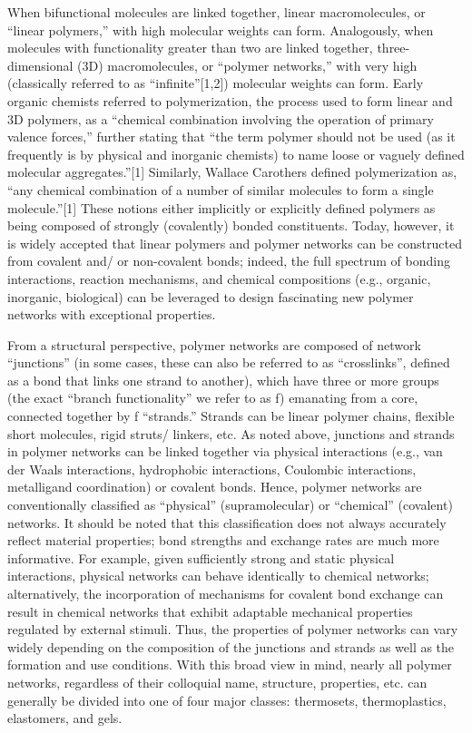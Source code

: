 \documentclass[../../main-notes.tex]{subfiles}
\begin{document}
When bifunctional molecules are linked together, linear macromolecules, or “linear polymers,” with high molecular weights can form. 
Analogously, when molecules with functionality greater than two are linked together, three-dimensional (3D) macromolecules, or “polymer networks,” with very high (classically referred to as “infinite”[1,2]) molecular weights can form. 
Early organic chemists referred to polymerization, the process used to form linear and 3D polymers, as a “chemical combination involving the operation of primary valence forces,” further stating that “the term polymer should not be used (as it frequently is by physical and inorganic chemists) to name loose or vaguely defined molecular aggregates.”[1] 
Similarly, Wallace Carothers defined polymerization as, “any chemical combination of a number of similar molecules to form a single molecule.”[1] 
These notions either implicitly or explicitly defined polymers as being composed of strongly (covalently) bonded constituents. 
Today, however, it is widely accepted that linear polymers and polymer networks can be constructed from covalent and/ or non-covalent bonds; indeed, the full spectrum of bonding interactions, reaction mechanisms, and chemical compositions (e.g., organic, inorganic, biological) can be leveraged to design fascinating new polymer networks with exceptional properties.

From a structural perspective, polymer networks are composed of network “junctions” (in some cases, these can also be referred to as “crosslinks”, defined as a bond that links one strand to another), which have three or more groups (the exact “branch functionality” we refer to as f) emanating from a core, connected together by f “strands.” 
Strands can be linear polymer chains, flexible short molecules, rigid struts/ linkers, etc. 
As noted above, junctions and strands in polymer networks can be linked together via physical interactions (e.g., van der Waals interactions, hydrophobic interactions, Coulombic interactions, metalligand coordination) or covalent bonds. 
Hence, polymer networks are conventionally classified as “physical” (supramolecular) or “chemical” (covalent) networks. 
It should be noted that this classification does not always accurately reflect material properties; bond strengths and exchange rates are much more informative. 
For example, given sufficiently strong and static physical interactions, physical networks can behave identically to chemical networks; alternatively, the incorporation of mechanisms for covalent bond exchange can result in chemical networks that exhibit adaptable mechanical properties regulated by external stimuli. 
Thus, the properties of polymer networks can vary widely depending on the composition of the junctions and strands as well as the formation and use conditions. 
With this broad view in mind, nearly all polymer networks, regardless of their colloquial name, structure, properties, etc. can generally be divided into one of four major classes: thermosets, thermoplastics, elastomers, and gels.
\end{document}
